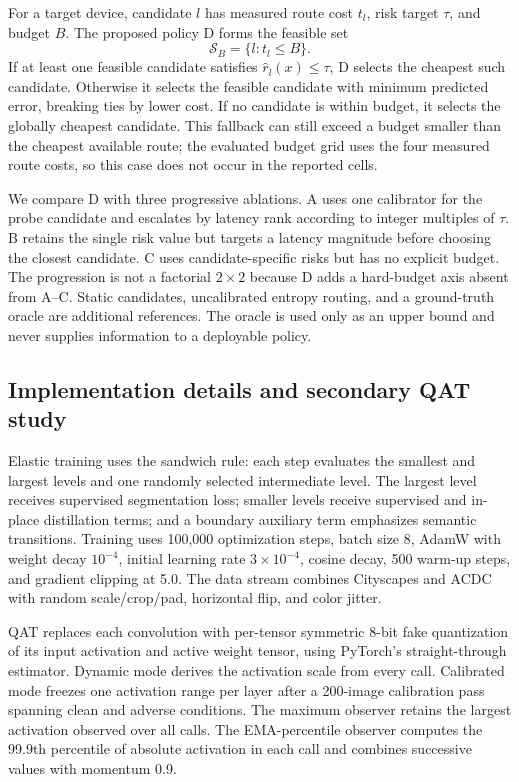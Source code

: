 \documentclass[a4paper,review,12pt]{elsarticle}
\begin{document}
For a target device, candidate $l$ has measured route cost $t_l$, risk target $\tau$, and budget $B$. The proposed policy D forms the feasible set
\begin{equation}
\mathcal{S}_B=\{l:t_l\leq B\}.
\label{eq:feasible}
\end{equation}
If at least one feasible candidate satisfies $\widehat{r}_l(x)\leq\tau$, D selects the cheapest such candidate. Otherwise it selects the feasible candidate with minimum predicted error, breaking ties by lower cost. If no candidate is within budget, it selects the globally cheapest candidate. This fallback can still exceed a budget smaller than the cheapest available route; the evaluated budget grid uses the four measured route costs, so this case does not occur in the reported cells.

We compare D with three progressive ablations. A uses one calibrator for the probe candidate and escalates by latency rank according to integer multiples of $\tau$. B retains the single risk value but targets a latency magnitude before choosing the closest candidate. C uses candidate-specific risks but has no explicit budget. The progression is not a factorial $2\times2$ because D adds a hard-budget axis absent from A--C. Static candidates, uncalibrated entropy routing, and a ground-truth oracle are additional references. The oracle is used only as an upper bound and never supplies information to a deployable policy.

\subsection{Implementation details and secondary QAT study}
\label{sec:qatmethod}

Elastic training uses the sandwich rule: each step evaluates the smallest and largest levels and one randomly selected intermediate level. The largest level receives supervised segmentation loss; smaller levels receive supervised and in-place distillation terms; and a boundary auxiliary term emphasizes semantic transitions. Training uses 100,000 optimization steps, batch size 8, AdamW with weight decay $10^{-4}$, initial learning rate $3\times10^{-4}$, cosine decay, 500 warm-up steps, and gradient clipping at 5.0. The data stream combines Cityscapes and ACDC with random scale/crop/pad, horizontal flip, and color jitter.

QAT replaces each convolution with per-tensor symmetric 8-bit fake quantization of its input activation and active weight tensor, using PyTorch's straight-through estimator. Dynamic mode derives the activation scale from every call. Calibrated mode freezes one activation range per layer after a 200-image calibration pass spanning clean and adverse conditions. The maximum observer retains the largest activation observed over all calls. The EMA-percentile observer computes the 99.9th percentile of absolute activation in each call and combines successive values with momentum 0.9.
\end{document}
